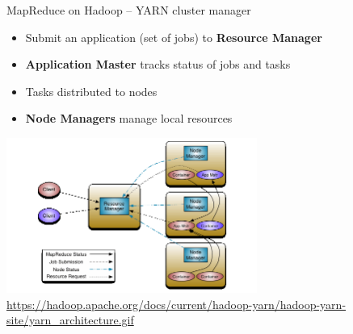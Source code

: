 \documentclass[ignorenonframetext,xcolor=x11names]{beamer}
\begin{document}




\begin{frame}{MapReduce on Hadoop -- YARN cluster manager}
\begin{itemize}
   \item Submit an application (set of jobs) to \textbf{Resource Manager}
   \item \textbf{Application Master} tracks status of jobs and tasks
   \item Tasks distributed to nodes
   \item \textbf{Node Managers} manage local resources
\end{itemize}

\centering
\includegraphics[height=2in]{yarn_architecture.png}\\

\scriptsize\url{https://hadoop.apache.org/docs/current/hadoop-yarn/hadoop-yarn-site/yarn_architecture.gif}\normalsize

\end{frame}
\end{document}
